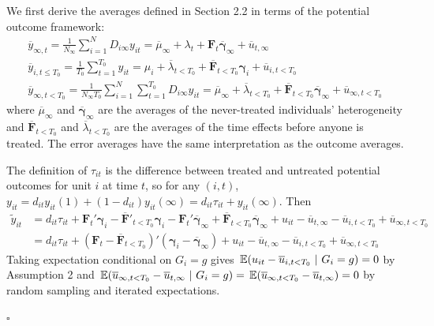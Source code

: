 \documentclass[12pt]{article}
\begin{document}
We first derive the averages defined in Section 2.2 in terms of the potential outcome framework:
\begin{gather*}
    \overline{y}_{\infty , t} = \frac{1}{N_{\infty}} \sum_{i = 1}^N D_{i \infty} y_{it} = \overline{\mu}_{\infty} + \lambda_t + \bm{F}_t \overline{\bm \gamma}_{\infty} + \overline{u}_{t, \infty}\\
    \overline{y}_{i,t\leq T_0} = \frac{1}{T_0} \sum_{t = 1}^{T_0} y_{it} = \mu_i + \overline{\lambda}_{t < T_0} + \overline{\bm{F}}_{t < T_0} \bm \gamma_i + \overline{u}_{i,t < T_0}\\
    \overline{y}_{\infty, t < T_0} = \frac{1}{N_{\infty} T_0} \sum_{i = 1}^N \sum_{t = 1}^{T_0} D_{i \infty} y_{it} = \overline{\mu}_{\infty} + \overline{\lambda}_{t < T_0} + \overline{\bm{F}}_{t < T_0} \overline{\bm \gamma}_{\infty} + \overline{u}_{\infty, t < T_0}
\end{gather*}
where $\overline{\mu}_{\infty}$ and $\overline{\bm \gamma}_{\infty}$ are the averages of the never-treated individuals' heterogeneity and $\overline{\bm{F}}_{t < T_0}$ and $\overline{\lambda}_{t < T_0}$ are the averages of the time effects before anyone is treated. The error averages have the same interpretation as the outcome averages.

The definition of $\tau_{it}$ is the difference between treated and untreated potential outcomes for unit $i$ at time $t$, so for any $(i,t)$, $y_{it} = d_{it} y_{it}(1) + (1-d_{it})y_{it}(\infty) = d_{it} \tau_{it} + y_{it}(\infty)$. Then
\begin{align*}
    \tilde{y}_{it} 
    &= d_{it} \tau_{it} + \bm{F}_t' \bm \gamma_i - \overline{\bm{F}}'_{t < T_0} \bm \gamma_i - \bm{F}_t' \overline{\bm \gamma}_{\infty} + \overline{\bm{F}}_{t < T_0} \overline{\bm \gamma}_{\infty} + u_{it} - \overline{u}_{t,\infty} - \overline{u}_{i, t < T_0} + \overline{u}_{\infty, t < T_0}\\
    &= d_{it} \tau_{it} + (\bm{F}_t - \overline{\bm{F}}_{t < T_0})' (\bm \gamma_i - \overline{\bm \gamma}_{\infty}) + u_{it} - \overline{u}_{t,\infty} - \overline{u}_{i, t < T_0} + \overline{u}_{\infty, t < T_0}
\end{align*}
Taking expectation conditional on $G_i = g$ gives $\expec{u_{it} - \overline{u}_{i, t < T_0}}{G_i = g} = 0$ by Assumption 2 and $\expec{\overline{u}_{\infty, t < T_0} - \overline{u}_{t, \infty} }{G_i = g} = \expec{\overline{u}_{\infty, t < T_0} - \overline{u}_{t, \infty}} = 0$ by random sampling and iterated expectations.

$\square$
\end{document}
